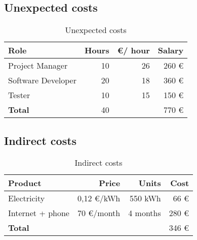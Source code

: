 \subsection{Unexpected costs}
\begin{frame}{\insertsubsec}
  \begin{table}[H]
    \centering
    \begin{tabular}{|l|r|r|r|}
      \hline
      \textbf{Role} & \textbf{Hours} & \textbf{\euro / hour} & \textbf{Salary} \\ \hline\hline
      Project Manager & 10 & 26 & 260 \euro \\ \hline
      Software Developer & 20 & 18 & 360 \euro \\ \hline
      Tester & 10 & 15 & 150 \euro \\ \hline
  
      \hline\hline
      \textbf{Total} & 40 & & 770 \euro \\ 
      \hline
    \end{tabular}
    \caption{Unexpected costs \label{tab:unexpected-costs}}
  \end{table}
\end{frame}

\subsection{Indirect costs}
\begin{frame}{\insertsubsec}
  \begin{table}[H]
    \centering
    \begin{tabular}{|l|r|r|r|}
      \hline
      \textbf{Product} & \textbf{Price} & \textbf{Units} & \textbf{Cost} \\ \hline\hline
  
      Electricity & 0,12 \euro/kWh & 550 kWh & 66 \euro \\ \hline
      Internet + phone & 70 \euro/month & 4 months & 280 \euro \\ \hline
      
      \hline\hline
      \textbf{Total} & & & 346 \euro \\ \hline
    \end{tabular}
    \caption{Indirect costs \label{tab:indirect-costs}}
  \end{table}
\end{frame}

